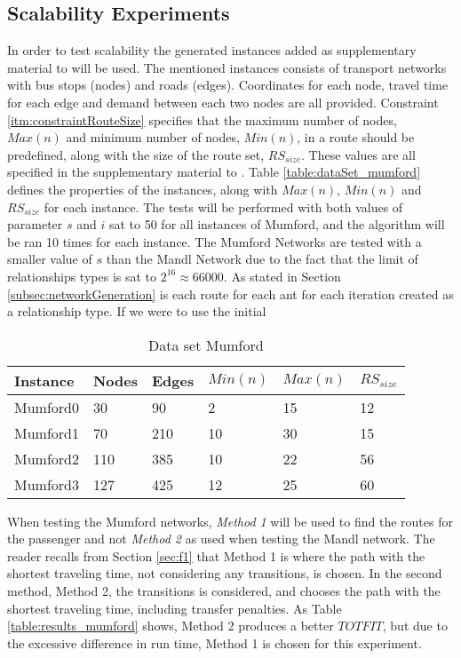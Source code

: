 \subsection{Scalability Experiments}
\label{subsec:scalabilityExperiments_setup}

In order to test scalability the generated instances added as supplementary material to \citet{mumford13} will be used.
The mentioned instances consists of transport networks with bus stops (nodes) and roads (edges). Coordinates for each node, travel time for each edge and demand between each two nodes are all provided. Constraint \vref{itm:constraintRouteSize} specifies that the maximum number of nodes, $Max(n)$ and minimum number of nodes, $Min(n)$, in a route should be predefined, along with the size of the route set, $RS_{size}$. These values are all specified in the supplementary material to \citet{mumford13}. Table \vref{table:dataSet_mumford} defines the properties of the instances, along with $Max(n)$, $Min(n)$ and $RS_{size}$ for each instance. The tests will be performed with both values of parameter $s$ and $i$ sat to 50 for all instances of Mumford, and the algorithm will be ran 10 times for each instance. The Mumford Networks are tested with a smaller value of $s$ than the Mandl Network due to the fact that the limit of relationships types is sat to $2^{16} \approx 66 000$. As stated in Section \vref{subsec:networkGeneration} is each route for each ant for each iteration created as a relationship type. If we were to use the initial  

\begin{table}[H]
	\centering
	\begin{tabular}{|l|l|l|l|l|l|}
    	\hline
    	Instance & Nodes&Edges & $Min(n)$ & $Max(n)$ & $RS_{size}$\\
    	\hline
   	    Mumford0 & 30&90 & 2&15 & 12 \\
   	    Mumford1 & 70&210 & 10&30 & 15 \\
   	    Mumford2 & 110&385 & 10&22 & 56 \\
   	    Mumford3 & 127&425 & 12&25 & 60 \\
   	    \hline
    \end{tabular}
    \caption{Data set Mumford}
    \label{table:dataSet_mumford}
\end{table}

When testing the Mumford networks, \textit{Method 1} will be used to find the routes for the passenger and not \textit{Method 2} as used when testing the Mandl network. The reader recalls from Section \vref{sec:f1} that Method 1 is where the path with the shortest traveling time, not considering any transitions, is chosen. In the second method, Method 2, the transitions is considered, and chooses the path with the shortest traveling time, including transfer penalties. As Table \vref{table:results_mumford} shows, Method 2 produces a better $TOTFIT$, but due to the excessive difference in run time, Method 1 is chosen for this experiment. 

